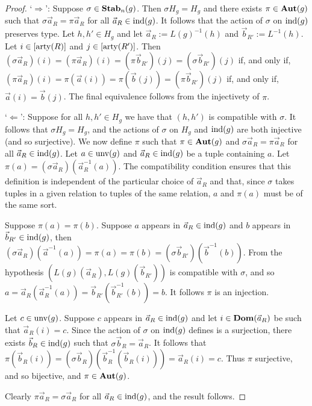 \documentclass[../paper.tex]{subfiles}
\begin{document}
\begin{proof}
  `$\Rightarrow$': Suppose $\sigma \in \text{\textbf{Stab}}_n(g)$. Then $\sigma H_g = H_g$ and
  there exists $\pi \in \text{\textbf{Aut}}(g)$ such that $\sigma \vec{a}_R = \pi \vec{a}_R$
  for all $\vec{a}_R \in \text{\upshape ind}(g)$. It follows that the action of $\sigma$ on
  $\text{\upshape ind}(g)$ preserves type. Let $h, h' \in H_g$ and let $\vec{a}_R :=
  L(g)^{-1}(h)$ and $\vec{b}_{R'} := L^{-1}(h)$. Let $i \in [\mathrm{arty} (R)]$ and $j
  \in [\mathrm{arty} (R')]$. Then $(\sigma \vec{a}_R) (i) = (\pi \vec{a}_R)(i) = (\pi
  \vec{b}_{R'})(j) = (\sigma \vec{b}_{R'})(j)$ if, and only if, $(\pi
  \vec{a}_R)(i) = \pi (\vec{a}(i)) = \pi (\vec{b}(j)) = (\pi\vec{b}_{R'})(j)$
  if, and only if, $\vec{a}(i) = \vec{b}(j)$. The final equivalence follows from
  the injectivety of $\pi$.
  
  `$\Leftarrow$': Suppose for all $h, h' \in H_g$ we have that $(h, h')$ is
  compatible with $\sigma$. It follows that $\sigma H_g = H_g$, and the actions
  of $\sigma$ on $H_g$ and $\text{\upshape ind}(g)$ are both injective (and so surjective). We
  now define $\pi$ such that $\pi \in \text{\textbf{Aut}}(g)$ and $\sigma \vec{a}_R = \pi
  \vec{a}_R$ for all $\vec{a}_R \in \text{\upshape ind}(g)$. Let $a \in \text{unv}(g)$ and
  $\vec{a}_R \in \text{\upshape ind}(g)$ be a tuple containing $a$. Let $\pi (a) = (\sigma
  \vec{a}_R) (\vec{a}^{-1}_R(a))$. The compatibility condition ensures that this
  definition is independent of the particular choice of $\vec{a}_R$ and that,
  since $\sigma$ takes tuples in a given relation to tuples of the same
  relation, $a$ and $\pi (a)$ must be of the same sort.
  
  Suppose $\pi(a) = \pi(b)$. Suppose $a$ appears in $\vec{a}_R \in \text{\upshape ind}(g)$ and
  $b$ appears in $\vec{b}_{R'} \in \text{\upshape ind}(g)$, then $(\sigma \vec{a}_R)
  (\vec{a}^{-1}(a)) = \pi (a) = \pi(b) = (\sigma
  \vec{b}_{R'})(\vec{b}^{-1}(b))$. From the hypothesis $(L(g)(\vec{a}_R),
  L(g)(\vec{b}_{R'}))$ is compatible with $\sigma$, and so $a =
  \vec{a}_R(\vec{a}^{-1}_R(a)) = \vec{b}_{R'}(\vec{b}^{-1}_{R'}(b)) = b$. It
  follows $\pi$ is an injection.
  
  Let $c \in \text{unv}(g)$. Suppose $c$ appears in $\vec{a}_R \in \text{\upshape ind}(g)$ and
  let $i \in \text{\textbf{Dom}}(\vec{a}_R)$ be such that $\vec{a}_R(i) = c$. Since the action
  of $\sigma$ on $\text{\upshape ind}(g)$ defines is a surjection, there exists $\vec{b}_R \in
  \text{\upshape ind}(g)$ such that $\sigma \vec{b}_R = \vec{a}_R$. It follows that $\pi
  (\vec{b}_R(i)) = (\sigma \vec{b}_R) (\vec{b}^{-1}_R(\vec{b}_R(i))) =
  \vec{a}_R(i) = c$. Thus $\pi$ surjective, and so bijective, and $\pi \in
  \text{\textbf{Aut}}(g)$.

  Clearly $\pi \vec{a}_R = \sigma \vec{a}_R$ for all $\vec{a}_R \in \text{\upshape ind}(g)$,
  and the result follows.
\end{proof}
\end{document}
